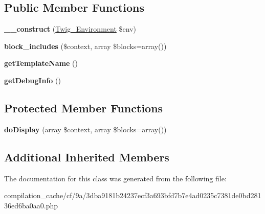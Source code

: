 \subsection*{Public Member Functions}
\begin{DoxyCompactItemize}
\item 
\hypertarget{class_____twig_template__cf9a3dba9181b24237ecf3a693bfd7b7e4ad0235c7381de0bd28136ed6ba0aa0_a4f8326243132c1450a81e0a817aa1be7}{}{\bfseries \+\_\+\+\_\+construct} (\hyperlink{class_twig___environment}{Twig\+\_\+\+Environment} \$env)\label{class_____twig_template__cf9a3dba9181b24237ecf3a693bfd7b7e4ad0235c7381de0bd28136ed6ba0aa0_a4f8326243132c1450a81e0a817aa1be7}

\item 
\hypertarget{class_____twig_template__cf9a3dba9181b24237ecf3a693bfd7b7e4ad0235c7381de0bd28136ed6ba0aa0_aa16f29e2939d91d00a00d8deb8fde500}{}{\bfseries block\+\_\+includes} (\$context, array \$blocks=array())\label{class_____twig_template__cf9a3dba9181b24237ecf3a693bfd7b7e4ad0235c7381de0bd28136ed6ba0aa0_aa16f29e2939d91d00a00d8deb8fde500}

\item 
\hypertarget{class_____twig_template__cf9a3dba9181b24237ecf3a693bfd7b7e4ad0235c7381de0bd28136ed6ba0aa0_a621a3ccd148ed8b9e937da6959c98f39}{}{\bfseries get\+Template\+Name} ()\label{class_____twig_template__cf9a3dba9181b24237ecf3a693bfd7b7e4ad0235c7381de0bd28136ed6ba0aa0_a621a3ccd148ed8b9e937da6959c98f39}

\item 
\hypertarget{class_____twig_template__cf9a3dba9181b24237ecf3a693bfd7b7e4ad0235c7381de0bd28136ed6ba0aa0_abd0ecb0136f4228db2bd963bfc1e20d7}{}{\bfseries get\+Debug\+Info} ()\label{class_____twig_template__cf9a3dba9181b24237ecf3a693bfd7b7e4ad0235c7381de0bd28136ed6ba0aa0_abd0ecb0136f4228db2bd963bfc1e20d7}

\end{DoxyCompactItemize}
\subsection*{Protected Member Functions}
\begin{DoxyCompactItemize}
\item 
\hypertarget{class_____twig_template__cf9a3dba9181b24237ecf3a693bfd7b7e4ad0235c7381de0bd28136ed6ba0aa0_adb62b7c226e07d30f836ed16158d924f}{}{\bfseries do\+Display} (array \$context, array \$blocks=array())\label{class_____twig_template__cf9a3dba9181b24237ecf3a693bfd7b7e4ad0235c7381de0bd28136ed6ba0aa0_adb62b7c226e07d30f836ed16158d924f}

\end{DoxyCompactItemize}
\subsection*{Additional Inherited Members}


The documentation for this class was generated from the following file\+:\begin{DoxyCompactItemize}
\item 
compilation\+\_\+cache/cf/9a/3dba9181b24237ecf3a693bfd7b7e4ad0235c7381de0bd28136ed6ba0aa0.\+php\end{DoxyCompactItemize}
